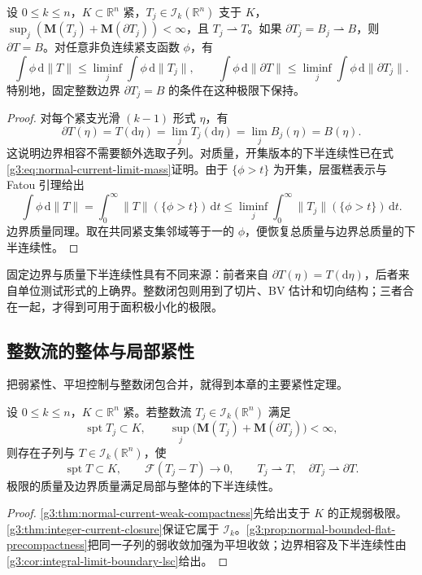 \begin{corollary}\label{g3:cor:integral-limit-boundary-lsc}
	设 \(0\le k\le n\)，\(K\subset\mathbb R^n\) 紧，\(T_j\in\mathcal I_k(\mathbb R^n)\) 支于 \(K\)，\(\sup_j(\mathbf M(T_j)+\mathbf M(\partial T_j))<\infty\)，且 \(T_j\rightharpoonup T\)。如果
	\(\partial T_j=B_j\rightharpoonup B\)，则 \(\partial T=B\)。对任意非负连续紧支函数 \(\phi\)，有
	\[
		\int\phi\,\mathrm d\|T\|
		\le\liminf_j\int\phi\,\mathrm d\|T_j\|,\qquad
		\int\phi\,\mathrm d\|\partial T\|
		\le\liminf_j\int\phi\,\mathrm d\|\partial T_j\|.
	\]
	特别地，固定整数边界 \(\partial T_j=B\) 的条件在这种极限下保持。
\end{corollary}
\begin{proof}
	对每个紧支光滑 \((k-1)\) 形式 \(\eta\)，有
	\[
		\partial T(\eta)
		=T(\mathrm d\eta)
		=\lim_jT_j(\mathrm d\eta)
		=\lim_j B_j(\eta)=B(\eta).
	\]
	这说明边界相容不需要额外选取子列。对质量，开集版本的下半连续性已在式\eqref{g3:eq:normal-current-limit-mass}证明。由于 \(\{\phi>t\}\) 为开集，层蛋糕表示与 Fatou 引理给出
	\[
		\int\phi\,\mathrm d\|T\|
		=\int_0^\infty\|T\|(\{\phi>t\})\,\mathrm dt
		\le\liminf_j\int_0^\infty\|T_j\|(\{\phi>t\})\,\mathrm dt.
	\]
	边界质量同理。取在共同紧支集邻域等于一的 \(\phi\)，便恢复总质量与边界总质量的下半连续性。
\end{proof}

固定边界与质量下半连续性具有不同来源：前者来自 \(\partial T(\eta)=T(\mathrm d\eta)\)，后者来自单位测试形式的上确界。整数闭包则用到了切片、BV 估计和切向结构；三者合在一起，才得到可用于面积极小化的极限。

\subsection{整数流的整体与局部紧性}
\label{g3:subsec:2205:07}
把弱紧性、平坦控制与整数闭包合并，就得到本章的主要紧性定理。

\begin{theorem}\label{g3:thm:federer-fleming-compactness}
	设 \(0\le k\le n\)，\(K\subset\mathbb R^n\) 紧。若整数流 \(T_j\in\mathcal I_k(\mathbb R^n)\) 满足
	\[
		\operatorname{spt}T_j\subset K,\qquad
		\sup_j\bigl(\mathbf M(T_j)+\mathbf M(\partial T_j)\bigr)<\infty,
	\]
	则存在子列与 \(T\in\mathcal I_k(\mathbb R^n)\)，使
	\[
		\operatorname{spt}T\subset K,\qquad
		\mathcal F(T_j-T)\longrightarrow0,\qquad
		T_j\rightharpoonup T,\quad
		\partial T_j\rightharpoonup\partial T.
	\]
	极限的质量及边界质量满足局部与整体的下半连续性。
\end{theorem}
\begin{proof}
	\cref{g3:thm:normal-current-weak-compactness}先给出支于 \(K\) 的正规弱极限。\cref{g3:thm:integer-current-closure}保证它属于 \(\mathcal I_k\)。\cref{g3:prop:normal-bounded-flat-precompactness}把同一子列的弱收敛加强为平坦收敛；边界相容及下半连续性由\cref{g3:cor:integral-limit-boundary-lsc}给出。
\end{proof}

